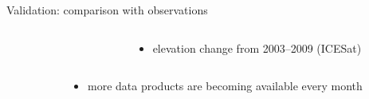 \documentclass[hide notes,intlimits]{beamer}
\begin{document}
\begin{frame}{Validation: comparison with observations}
\begin{columns}[c]
\begin{column}{.4\linewidth}
\begin{figure}
     \end{figure}
   \end{column}
   \begin{column}{.6\linewidth}
     \begin{itemize}     
     \item elevation change from 2003--2009 (ICESat)
     \end{itemize}
 \end{column}
 \end{columns}   
 \begin{columns}[c]
   \begin{column}{.4\linewidth}
   \end{column}
   \begin{column}{.6\linewidth}
     \begin{itemize}     
     \item more data products are becoming available every month
     \end{itemize}
 \end{column}
 \end{columns}   

\end{frame}
\end{document}
